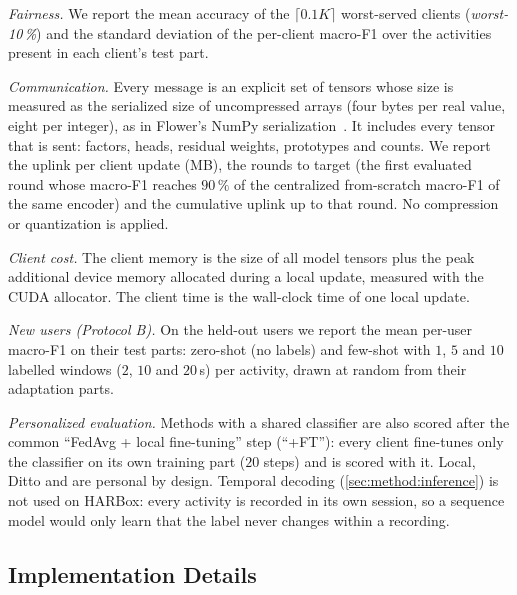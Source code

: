 \emph{Fairness.} We report the mean accuracy of the $\lceil0.1K\rceil$ worst-served clients
(\emph{worst-10\,\%}) and the standard deviation of the per-client macro-F1 over the activities
present in each client's test part.

\emph{Communication.} Every message is an explicit set of tensors whose size is measured as the
serialized size of uncompressed arrays (four bytes per real value, eight per integer), as in
Flower's NumPy serialization~\cite{beutel2020flower}. It includes every tensor that is sent:
factors, heads, residual weights, prototypes and counts. We report the uplink per client update
(MB), the rounds to target (the first evaluated round whose macro-F1 reaches $90\,\%$ of the
centralized from-scratch macro-F1 of the same encoder) and the cumulative uplink up to that round.
No compression or quantization is applied.

\emph{Client cost.} The client memory is the size of all model tensors plus the peak additional
device memory allocated during a local update, measured with the CUDA allocator. The client time
is the wall-clock time of one local update.

\emph{New users (Protocol B).} On the \HBHeldoutB{} held-out users we report the mean per-user
macro-F1 on their test parts: zero-shot (no labels) and few-shot with $1$, $5$ and $10$ labelled
windows ($2$, $10$ and $20$\,s) per activity, drawn at random from their adaptation parts.

\emph{Personalized evaluation.} Methods with a shared classifier are also scored after the common
``FedAvg + local fine-tuning'' step (``+FT''): every client fine-tunes only the classifier on its
own training part ($20$ steps) and is scored with it. Local, Ditto and \method{} are personal by
design. Temporal decoding (\cref{sec:method:inference}) is not used on HARBox: every activity is
recorded in its own session, so a sequence model would only learn that the label never changes
within a recording.

\subsection{Implementation Details}\label{sec:data:impl}

